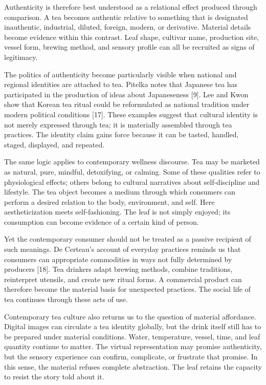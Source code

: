 \documentclass[11pt,a4paper]{article}
\begin{document}
Authenticity is therefore best understood as a relational effect produced through comparison. A tea becomes authentic relative to something that is designated inauthentic, industrial, diluted, foreign, modern, or derivative. Material details become evidence within this contrast. Leaf shape, cultivar name, production site, vessel form, brewing method, and sensory profile can all be recruited as signs of legitimacy.

The politics of authenticity become particularly visible when national and regional identities are attached to tea. Pitelka notes that Japanese tea has participated in the production of ideas about Japaneseness [9]. Lee and Kwon show that Korean tea ritual could be reformulated as national tradition under modern political conditions [17]. These examples suggest that cultural identity is not merely expressed through tea; it is materially assembled through tea practices. The identity claim gains force because it can be tasted, handled, staged, displayed, and repeated.

The same logic applies to contemporary wellness discourse. Tea may be marketed as natural, pure, mindful, detoxifying, or calming. Some of these qualities refer to physiological effects; others belong to cultural narratives about self-discipline and lifestyle. The tea object becomes a medium through which consumers can perform a desired relation to the body, environment, and self. Here aestheticization meets self-fashioning. The leaf is not simply enjoyed; its consumption can become evidence of a certain kind of person.

Yet the contemporary consumer should not be treated as a passive recipient of such meanings. De Certeau's account of everyday practices reminds us that consumers can appropriate commodities in ways not fully determined by producers [18]. Tea drinkers adapt brewing methods, combine traditions, reinterpret utensils, and create new ritual forms. A commercial product can therefore become the material basis for unexpected practices. The social life of tea continues through these acts of use.

Contemporary tea culture also returns us to the question of material affordance. Digital images can circulate a tea identity globally, but the drink itself still has to be prepared under material conditions. Water, temperature, vessel, time, and leaf quantity continue to matter. The virtual representation may promise authenticity, but the sensory experience can confirm, complicate, or frustrate that promise. In this sense, the material refuses complete abstraction. The leaf retains the capacity to resist the story told about it.
\end{document}
